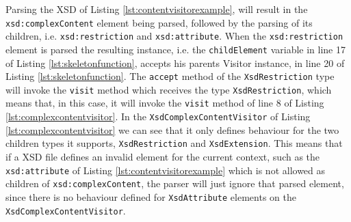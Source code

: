 \noindent
Parsing the \ac{XSD} of Listing \ref{lst:contentvisitorexample}, will result in the \texttt{xsd:complexContent} element being parsed, followed by the parsing of its children, i.e. \texttt{xsd:restriction} and \texttt{xsd:attribute}. When the \texttt{xsd:restriction} element is parsed the resulting instance, i.e. the \texttt{childElement} variable in line 17 of Listing \ref{lst:skeletonfunction}, accepts his parents Visitor instance, in line 20 of Listing \ref{lst:skeletonfunction}. The \texttt{accept} method of the \texttt{XsdRestriction} type will invoke the \texttt{visit} method which receives the type \texttt{XsdRestriction}, which means that, in this case, it will invoke the \texttt{visit} method of line 8 of Listing \ref{lst:complexcontentvisitor}. In the \texttt{XsdComplexContentVisitor} of Listing \ref{lst:complexcontentvisitor} we can see that it only defines behaviour for the two children types it supports, \texttt{XsdRestriction} and \texttt{XsdExtension}. This means that if a \ac{XSD} file defines an invalid element for the current context, such as the \texttt{xsd:attribute} of Listing \ref{lst:contentvisitorexample} which is not allowed as children of \texttt{xsd:complexContent}, the parser will just ignore that parsed element, since there is no behaviour defined for \texttt{XsdAttribute} elements on the \texttt{XsdComplexContentVisitor}. 

\bigskip


